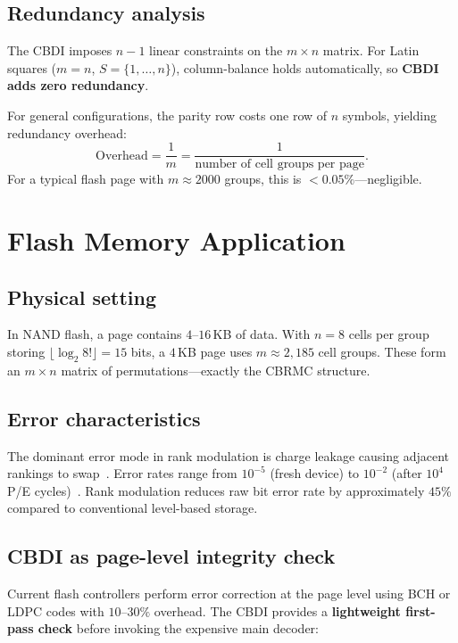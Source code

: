 \documentclass[11pt]{article}
\begin{document}
\subsection{Redundancy analysis}

The CBDI imposes $n-1$ linear constraints on the $m \times n$ matrix. For Latin squares ($m = n$, $S = \{1,\dots,n\}$), column-balance holds automatically, so \textbf{CBDI adds zero redundancy}.

For general configurations, the parity row costs one row of $n$ symbols, yielding redundancy overhead:
\[
\text{Overhead} = \frac{1}{m} = \frac{1}{\text{number of cell groups per page}}.
\]
For a typical flash page with $m \approx 2000$ groups, this is $< 0.05\%$---negligible.

\section{Flash Memory Application}
\label{sec:flash}

\subsection{Physical setting}

In NAND flash, a page contains $4$--$16$\,KB of data. With $n = 8$ cells per group storing $\lfloor \log_2 8! \rfloor = 15$ bits, a $4$\,KB page uses $m \approx 2{,}185$ cell groups. These form an $m \times n$ matrix of permutations---exactly the CBRMC structure.

\subsection{Error characteristics}

The dominant error mode in rank modulation is charge leakage causing adjacent rankings to swap~\cite{jiang2009}. Error rates range from $10^{-5}$ (fresh device) to $10^{-2}$ (after $10^4$ P/E cycles)~\cite{cai2017}. Rank modulation reduces raw bit error rate by approximately $45\%$ compared to conventional level-based storage.

\subsection{CBDI as page-level integrity check}

Current flash controllers perform error correction at the page level using BCH or LDPC codes with $10$--$30\%$ overhead. The CBDI provides a \textbf{lightweight first-pass check} before invoking the expensive main decoder:
\end{document}
